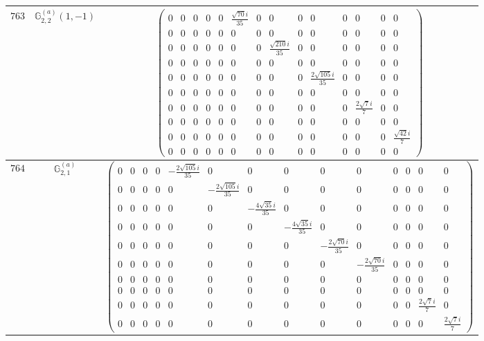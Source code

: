 \documentclass[fleqn,8pt,landscape]{jsarticle}
\begin{document}
\begin{center}
\begin{longtable}{ccc}
$ 763 $ & $ \mathbb{G}_{2,2}^{(a)}(1,-1) $ & $ \begin{pmatrix} 0 & 0 & 0 & 0 & 0 & \frac{\sqrt{70} i}{35} & 0 & 0 & 0 & 0 & 0 & 0 & 0 & 0 \\ 0 & 0 & 0 & 0 & 0 & 0 & 0 & 0 & 0 & 0 & 0 & 0 & 0 & 0 \\ 0 & 0 & 0 & 0 & 0 & 0 & 0 & \frac{\sqrt{210} i}{35} & 0 & 0 & 0 & 0 & 0 & 0 \\ 0 & 0 & 0 & 0 & 0 & 0 & 0 & 0 & 0 & 0 & 0 & 0 & 0 & 0 \\ 0 & 0 & 0 & 0 & 0 & 0 & 0 & 0 & 0 & \frac{2 \sqrt{105} i}{35} & 0 & 0 & 0 & 0 \\ 0 & 0 & 0 & 0 & 0 & 0 & 0 & 0 & 0 & 0 & 0 & 0 & 0 & 0 \\ 0 & 0 & 0 & 0 & 0 & 0 & 0 & 0 & 0 & 0 & 0 & \frac{2 \sqrt{7} i}{7} & 0 & 0 \\ 0 & 0 & 0 & 0 & 0 & 0 & 0 & 0 & 0 & 0 & 0 & 0 & 0 & 0 \\ 0 & 0 & 0 & 0 & 0 & 0 & 0 & 0 & 0 & 0 & 0 & 0 & 0 & \frac{\sqrt{42} i}{7} \\ 0 & 0 & 0 & 0 & 0 & 0 & 0 & 0 & 0 & 0 & 0 & 0 & 0 & 0 \end{pmatrix} $ \\ \hline
$ 764 $ & $ \mathbb{G}_{2,1}^{(a)} $ & $ \begin{pmatrix} 0 & 0 & 0 & 0 & - \frac{2 \sqrt{105} i}{35} & 0 & 0 & 0 & 0 & 0 & 0 & 0 & 0 & 0 \\ 0 & 0 & 0 & 0 & 0 & - \frac{2 \sqrt{105} i}{35} & 0 & 0 & 0 & 0 & 0 & 0 & 0 & 0 \\ 0 & 0 & 0 & 0 & 0 & 0 & - \frac{4 \sqrt{35} i}{35} & 0 & 0 & 0 & 0 & 0 & 0 & 0 \\ 0 & 0 & 0 & 0 & 0 & 0 & 0 & - \frac{4 \sqrt{35} i}{35} & 0 & 0 & 0 & 0 & 0 & 0 \\ 0 & 0 & 0 & 0 & 0 & 0 & 0 & 0 & - \frac{2 \sqrt{70} i}{35} & 0 & 0 & 0 & 0 & 0 \\ 0 & 0 & 0 & 0 & 0 & 0 & 0 & 0 & 0 & - \frac{2 \sqrt{70} i}{35} & 0 & 0 & 0 & 0 \\ 0 & 0 & 0 & 0 & 0 & 0 & 0 & 0 & 0 & 0 & 0 & 0 & 0 & 0 \\ 0 & 0 & 0 & 0 & 0 & 0 & 0 & 0 & 0 & 0 & 0 & 0 & 0 & 0 \\ 0 & 0 & 0 & 0 & 0 & 0 & 0 & 0 & 0 & 0 & 0 & 0 & \frac{2 \sqrt{7} i}{7} & 0 \\ 0 & 0 & 0 & 0 & 0 & 0 & 0 & 0 & 0 & 0 & 0 & 0 & 0 & \frac{2 \sqrt{7} i}{7} \end{pmatrix} $ \\ \hline

\end{longtable}
\end{center}
\end{document}

